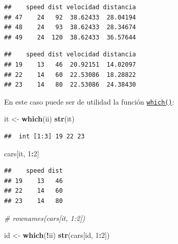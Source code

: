 \documentclass[
]{book}
\newenvironment{Shaded}{\begin{snugshade}}{\end{snugshade}}
\newcommand{\CommentTok}[1]{\textcolor[rgb]{0.56,0.35,0.01}{\textit{#1}}}
\newcommand{\DecValTok}[1]{\textcolor[rgb]{0.00,0.00,0.81}{#1}}
\newcommand{\KeywordTok}[1]{\textcolor[rgb]{0.13,0.29,0.53}{\textbf{#1}}}
\newcommand{\NormalTok}[1]{#1}
\newcommand{\OperatorTok}[1]{\textcolor[rgb]{0.81,0.36,0.00}{\textbf{#1}}}
\newcommand{\StringTok}[1]{\textcolor[rgb]{0.31,0.60,0.02}{#1}}
\begin{document}
\begin{verbatim}
##    speed dist velocidad distancia
## 47    24   92  38.62433  28.04194
## 48    24   93  38.62433  28.34674
## 49    24  120  38.62433  36.57644
\end{verbatim}

\begin{Shaded}
\end{Shaded}

\begin{verbatim}
##    speed dist velocidad distancia
## 19    13   46  20.92151  14.02097
## 22    14   60  22.53086  18.28822
## 23    14   80  22.53086  24.38430
\end{verbatim}

En este caso puede ser de utilidad la función \href{https://www.rdocumentation.org/packages/base/versions/3.6.1/topics/which}{\texttt{which()}}:

\begin{Shaded}
\begin{Highlighting}[]
\NormalTok{it <-}\StringTok{ }\KeywordTok{which}\NormalTok{(ii)}
\KeywordTok{str}\NormalTok{(it)}
\end{Highlighting}
\end{Shaded}

\begin{verbatim}
##  int [1:3] 19 22 23
\end{verbatim}

\begin{Shaded}
\begin{Highlighting}[]
\NormalTok{cars[it, }\DecValTok{1}\OperatorTok{:}\DecValTok{2}\NormalTok{]}
\end{Highlighting}
\end{Shaded}

\begin{verbatim}
##    speed dist
## 19    13   46
## 22    14   60
## 23    14   80
\end{verbatim}

\begin{Shaded}
\begin{Highlighting}[]
\CommentTok{# rownames(cars[it, 1:2])}

\NormalTok{id <-}\StringTok{ }\KeywordTok{which}\NormalTok{(}\OperatorTok{!}\NormalTok{ii)}
\KeywordTok{str}\NormalTok{(cars[id, }\DecValTok{1}\OperatorTok{:}\DecValTok{2}\NormalTok{])}
\end{Highlighting}
\end{Shaded}
\end{document}
